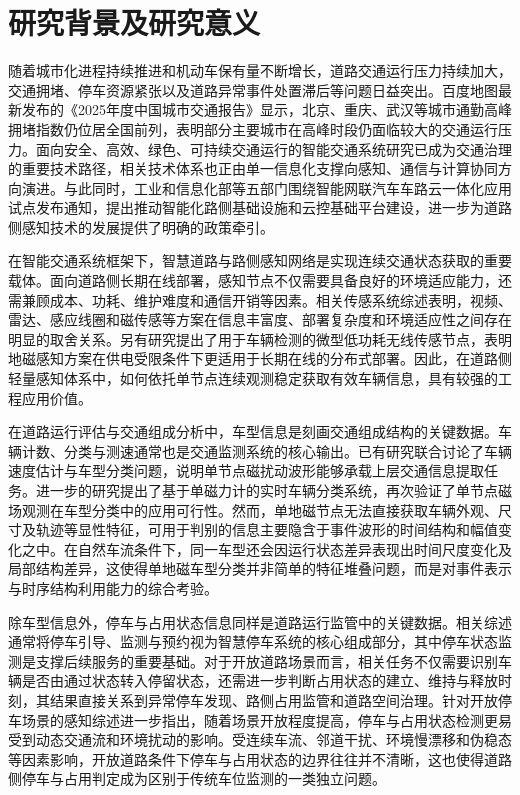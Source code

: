 \documentclass{xdupgthesis}
\begin{document}
\section{研究背景及研究意义}
\label{sec:intro_background}

随着城市化进程持续推进和机动车保有量不断增长，道路交通运行压力持续加大，交通拥堵、停车资源紧张以及道路异常事件处置滞后等问题日益突出。百度地图最新发布的《2025年度中国城市交通报告》显示，北京、重庆、武汉等城市通勤高峰拥堵指数仍位居全国前列，表明部分主要城市在高峰时段仍面临较大的交通运行压力\cite{R02}。面向安全、高效、绿色、可持续交通运行的智能交通系统研究已成为交通治理的重要技术路径，相关技术体系也正由单一信息化支撑向感知、通信与计算协同方向演进\cite{wang2023transportation5}。与此同时，工业和信息化部等五部门围绕智能网联汽车车路云一体化应用试点发布通知，提出推动智能化路侧基础设施和云控基础平台建设，进一步为道路侧感知技术的发展提供了明确的政策牵引\cite{R01}。

在智能交通系统框架下，智慧道路与路侧感知网络是实现连续交通状态获取的重要载体。面向道路侧长期在线部署，感知节点不仅需要具备良好的环境适应能力，还需兼顾成本、功耗、维护难度和通信开销等因素。相关传感系统综述表明，视频、雷达、感应线圈和磁传感等方案在信息丰富度、部署复杂度和环境适应性之间存在明显的取舍关系\cite{ch2_micko2023roadsensor}。另有研究提出了用于车辆检测的微型低功耗无线传感节点，表明地磁感知方案在供电受限条件下更适用于长期在线的分布式部署\cite{chovanec2014tinywsn}。因此，在道路侧轻量感知体系中，如何依托单节点连续观测稳定获取有效车辆信息，具有较强的工程应用价值。

在道路运行评估与交通组成分析中，车型信息是刻画交通组成结构的关键数据。车辆计数、分类与测速通常也是交通监测系统的核心输出\cite{taghvaeeyan2014portable}。已有研究联合讨论了车辆速度估计与车型分类问题，说明单节点磁扰动波形能够承载上层交通信息提取任务\cite{feng2022magmonitor}。进一步的研究提出了基于单磁力计的实时车辆分类系统，再次验证了单节点磁场观测在车型分类中的应用可行性\cite{ch3_sarcevic2022singlemag}。然而，单地磁节点无法直接获取车辆外观、尺寸及轨迹等显性特征，可用于判别的信息主要隐含于事件波形的时间结构和幅值变化之中。在自然车流条件下，同一车型还会因运行状态差异表现出时间尺度变化及局部结构差异，这使得单地磁车型分类并非简单的特征堆叠问题，而是对事件表示与时序结构利用能力的综合考验。

除车型信息外，停车与占用状态信息同样是道路运行监管中的关键数据。相关综述通常将停车引导、监测与预约视为智慧停车系统的核心组成部分，其中停车状态监测是支撑后续服务的重要基础\cite{kotb2017smartparking}。对于开放道路场景而言，相关任务不仅需要识别车辆是否由通过状态转入停留状态，还需进一步判断占用状态的建立、维持与释放时刻，其结果直接关系到异常停车发现、路侧占用监管和道路空间治理。针对开放停车场景的感知综述进一步指出，随着场景开放程度提高，停车与占用状态检测更易受到动态交通流和环境扰动的影响\cite{R52}。受连续车流、邻道干扰、环境慢漂移和伪稳态等因素影响，开放道路条件下停车与占用状态的边界往往并不清晰，这也使得道路侧停车与占用判定成为区别于传统车位监测的一类独立问题。
\end{document}
